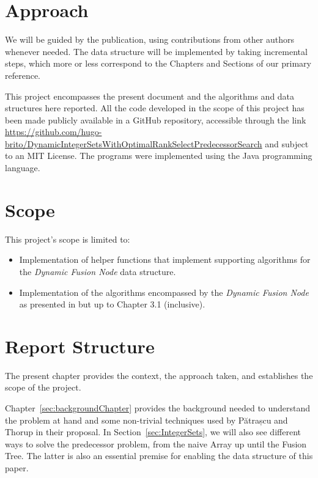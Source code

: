 \section{Approach} %

We will be guided by the \cite{patrascu2014dynamic} publication, using contributions from other authors whenever needed. The data structure will be implemented by taking incremental steps, which more or less correspond to the Chapters and Sections of our primary reference.

This project encompasses the present document and the algorithms and data structures here reported. All the code developed in the scope of this project has been made publicly available in a GitHub repository, accessible through the link \url{https://github.com/hugo-brito/DynamicIntegerSetsWithOptimalRankSelectPredecessorSearch} and subject to an MIT License.
The programs were implemented using the Java programming language.

\section{Scope} \label{sec:scope}

This project's scope is limited to:
\begin{itemize}
    \item
    Implementation of helper functions that implement supporting algorithms for the \textit{Dynamic Fusion Node} data structure.
    
    \item
    Implementation of the algorithms encompassed by the \textit{Dynamic Fusion Node} as presented in \cite{patrascu2014dynamic} but up to Chapter 3.1 (inclusive).
\end{itemize}

\section{Report Structure}

The present chapter provides the context, the approach taken, and establishes the scope of the project.

Chapter~\ref{sec:backgroundChapter} provides the background needed to understand the problem at hand and some non-trivial techniques used by Pătrașcu and Thorup in their proposal.
In Section~\ref{sec:IntegerSets}, we will also see different ways to solve the predecessor problem, from the naive Array up until the Fusion Tree.
The latter is also an essential premise for enabling the data structure of this paper.

